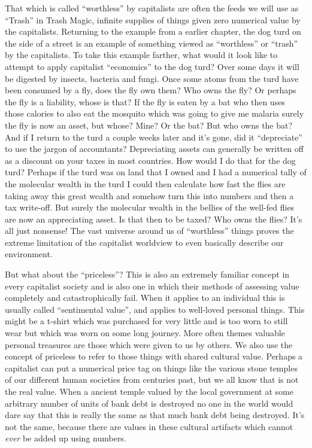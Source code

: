 That which is called ``worthless'' by capitalists are often the feeds we
will use as ``Trash'' in Trash Magic, infinite supplies of things given
zero numerical value by the capitalists. Returning to the example from a
earlier chapter, the dog turd on the side of a street is an example of
something viewed as ``worthless'' or ``trash'' by the capitalists. To
take this example farther, what would it look like to attempt to apply
capitalist ``economics'' to the dog turd? Over some days it will be
digested by insects, bacteria and fungi. Once some atoms from the turd
have been consumed by a fly, does the fly own them? Who owns the fly? Or
perhaps the fly is a liability, whose is that? If the fly is eaten by a
bat who then uses those calories to also eat the mosquito which was
going to give me malaria surely the fly is now an asset, but whose?
Mine? Or the bat? But who owns the bat? And if I return to the turd a
couple weeks later and it's gone, did it ``depreciate'' to use the
jargon of accountants? Depreciating assets can generally be written off
as a discount on your taxes in most countries. How would I do that for
the dog turd? Perhaps if the turd was on land that I owned and I had a
numerical tally of the molecular wealth in the turd I could then
calculate how fast the flies are taking away this great wealth and
somehow turn this into numbers and then a tax write-off. But surely the
molecular wealth in the bellies of the well-fed flies are now an
appreciating asset. Is that then to be taxed? Who owns the flies? It's
all just nonsense! The vast universe around us of ``worthless'' things
proves the extreme limitation of the capitalist worldview to even
basically describe our environment.

But what about the ``priceless''? This is also an extremely familiar
concept in every capitalist society and is also one in which their
methods of assessing value completely and catastrophically fail. When it
applies to an individual this is usually called ``sentimental value'',
and applies to well-loved personal things. This might be a t-shirt which
was purchased for very little and is too worn to still wear but which
was worn on some long journey. More often themes valuable personal
treasures are those which were given to us by others. We also use the
concept of priceless to refer to those things with shared cultural
value. Perhaps a capitalist can put a numerical price tag on things like
the various stone temples of our different human societies from
centuries past, but we all know that is not the real value. When a
ancient temple valued by the local government at some arbitrary number
of units of bank debt is destroyed no one in the world would dare say
that this is really the same as that much bank debt being destroyed.
It's not the same, because there are values in these cultural artifacts
which cannot \emph{ever} be added up using numbers.

